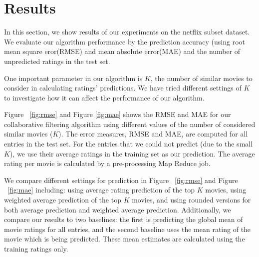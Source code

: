\section{Results}
In this section, we show results of our experiments on the netflix
subset dataset. We evaluate our algorithm performance by the
prediction accuracy (using root mean square eror(RMSE) and mean
absolute error(MAE) and the number of unpredicted ratings in the test
set.

One important parameter in our algorithm is $K$, the number of similar
movies to consider in calculating ratings' predictions. We have tried
different settings of $K$ to investigate how it can affect the
performance of our algorithm.


Figure ~\ref{fig:rmse} and Figure \ref{fig:mae} shows the RMSE and MAE
for our collaborative filtering algorithm using different values of
the number of considered similar movies ($K$). The error measures,
RMSE and MAE, are computed for all entries in the test set. For the
entries that we could not predict (due to the small $K$), we use their
average ratings in the training set as our prediction. The average
rating per movie is calculated by a pre-processing Map Reduce job.

We compare different settings for prediction in Figure ~\ref{fig:rmse}
and Figure ~\ref{fig:mae} including: using average rating prediction
of the top $K$ movies, using weighted average prediction of the top
$K$ movies, and using rounded versions for both average prediction and
weighted average prediction. Additionally, we compare our results to
two baselines: the first is predicting the global mean of movie
ratings for all entries, and the second baseline uses the mean rating
of the movie which is being predicted. These mean estimates are
calculated using the training ratings only.

